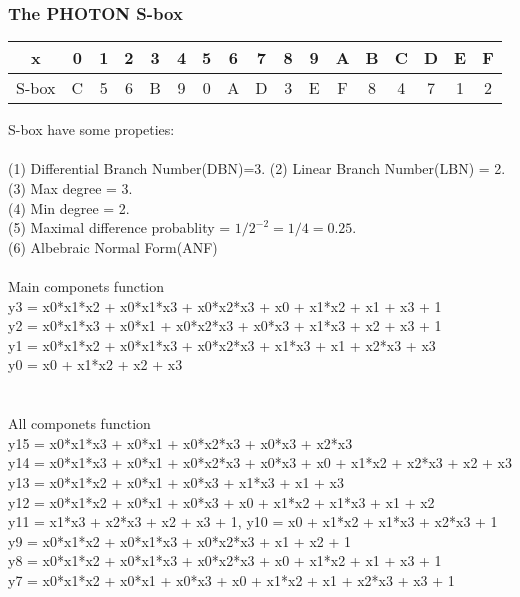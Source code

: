 \documentclass{article}
\begin{document}
\subsubsection{The PHOTON S-box}
\begin{center}
	\begin{tabular}{ |c||c|c|c|c|c|c|c|c|c|c|c|c|c|c|c|c|} 
		\hline
		x &0 &1 &2 &3 &4 &5 &6 &7 &8&9&A &B &C &D &E &F \\ 
		\hline
		S-box & C&5&6&B&9&0&A&D&3&E&F&8&4&7&1&2\\
		\hline
	\end{tabular}
\end{center}
S-box have some propeties:\\\\
(1) Differential Branch Number(DBN)=3. 
(2) Linear Branch Number(LBN) = 2.\\
(3) Max degree = 3.\\
(4) Min degree = 2.\\
(5) Maximal difference probablity = $1/2^{-2}=1/4=0.25$.\\
(6) Albebraic Normal Form(ANF)\\\\
Main componets function\\
y3 =  x0*x1*x2 + x0*x1*x3 + x0*x2*x3 + x0 + x1*x2 + x1 + x3 + 1\\
y2 =  x0*x1*x3 + x0*x1 + x0*x2*x3 + x0*x3 + x1*x3 + x2 + x3 + 1\\
y1 =  x0*x1*x2 + x0*x1*x3 + x0*x2*x3 + x1*x3 + x1 + x2*x3 + x3\\
 y0 =  x0 + x1*x2 + x2 + x3\\\\\\
All componets function\\
y15 =  x0*x1*x3 + x0*x1 + x0*x2*x3 + x0*x3 + x2*x3\\
y14 =  x0*x1*x3 + x0*x1 + x0*x2*x3 + x0*x3 + x0 + x1*x2 + x2*x3 + x2 + x3\\
y13 =  x0*x1*x2 + x0*x1 + x0*x3 + x1*x3 + x1 + x3\\
y12 =  x0*x1*x2 + x0*x1 + x0*x3 + x0 + x1*x2 + x1*x3 + x1 + x2\\
y11 =  x1*x3 + x2*x3 + x2 + x3 + 1,  y10 =  x0 + x1*x2 + x1*x3 + x2*x3 + 1\\
y9  =  x0*x1*x2 + x0*x1*x3 + x0*x2*x3 + x1 + x2 + 1\\
y8  =  x0*x1*x2 + x0*x1*x3 + x0*x2*x3 + x0 + x1*x2 + x1 + x3 + 1\\
y7  =  x0*x1*x2 + x0*x1 + x0*x3 + x0 + x1*x2 + x1 + x2*x3 + x3 + 1\\
\end{document}
